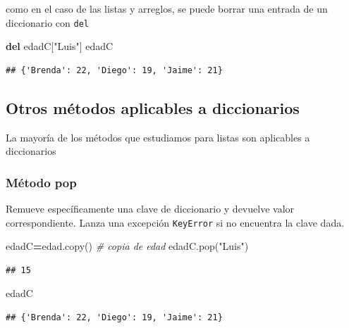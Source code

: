 \documentclass[
]{book}
\newenvironment{Shaded}{\begin{snugshade}}{\end{snugshade}}
\newcommand{\CommentTok}[1]{\textcolor[rgb]{0.56,0.35,0.01}{\textit{#1}}}
\newcommand{\KeywordTok}[1]{\textcolor[rgb]{0.13,0.29,0.53}{\textbf{#1}}}
\newcommand{\NormalTok}[1]{#1}
\newcommand{\OperatorTok}[1]{\textcolor[rgb]{0.81,0.36,0.00}{\textbf{#1}}}
\newcommand{\StringTok}[1]{\textcolor[rgb]{0.31,0.60,0.02}{#1}}
\theoremstyle{definition}
\theoremstyle{definition}
\theoremstyle{definition}
\theoremstyle{definition}
\theoremstyle{remark}
\begin{document}
como en el caso de las listas y arreglos, se puede borrar una entrada de un diccionario con \texttt{del}

\begin{Shaded}
\begin{Highlighting}[]
\KeywordTok{del}\NormalTok{ edadC[}\StringTok{"Luis"}\NormalTok{] }
\NormalTok{edadC}
\end{Highlighting}
\end{Shaded}

\begin{verbatim}
## {'Brenda': 22, 'Diego': 19, 'Jaime': 21}
\end{verbatim}

\hypertarget{otros-muxe9todos-aplicables-a-diccionarios}{%
\subsection{Otros métodos aplicables a diccionarios}\label{otros-muxe9todos-aplicables-a-diccionarios}}

La mayoría de los métodos que estudiamos para listas son aplicables a diccionarios

\hypertarget{muxe9todo-pop}{%
\subsubsection{Método pop}\label{muxe9todo-pop}}

Remueve específicamente una clave de diccionario y devuelve valor correspondiente. Lanza una excepción \texttt{KeyError} si no encuentra la clave dada.

\begin{Shaded}
\begin{Highlighting}[]
\NormalTok{edadC}\OperatorTok{=}\NormalTok{edad.copy() }\CommentTok{\# copia de edad }
\NormalTok{edadC.pop(}\StringTok{"Luis"}\NormalTok{)}
\end{Highlighting}
\end{Shaded}

\begin{verbatim}
## 15
\end{verbatim}

\begin{Shaded}
\begin{Highlighting}[]
\NormalTok{edadC}
\end{Highlighting}
\end{Shaded}

\begin{verbatim}
## {'Brenda': 22, 'Diego': 19, 'Jaime': 21}
\end{verbatim}
\end{document}
